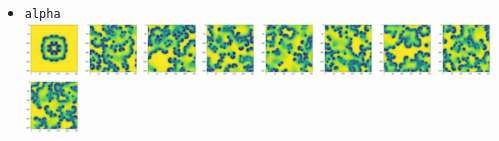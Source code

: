 \begin{itemize}
\item {\tt alpha}\\
\includegraphics[height=1.4cm]{python_codes/fieldstone_171/pearson93_rand/alpha_solution_0001000_u}
\includegraphics[height=1.4cm]{python_codes/fieldstone_171/pearson93_rand/alpha_solution_0005000_u}
\includegraphics[height=1.4cm]{python_codes/fieldstone_171/pearson93_rand/alpha_solution_0010000_u}
\includegraphics[height=1.4cm]{python_codes/fieldstone_171/pearson93_rand/alpha_solution_0015000_u}
\includegraphics[height=1.4cm]{python_codes/fieldstone_171/pearson93_rand/alpha_solution_0020000_u}
\includegraphics[height=1.4cm]{python_codes/fieldstone_171/pearson93_rand/alpha_solution_0030000_u}
\includegraphics[height=1.4cm]{python_codes/fieldstone_171/pearson93_rand/alpha_solution_0040000_u}
\includegraphics[height=1.4cm]{python_codes/fieldstone_171/pearson93_rand/alpha_solution_0050000_u}
\includegraphics[height=1.4cm]{python_codes/fieldstone_171/pearson93_rand/alpha_solution_final_u}\\

\end{itemize}
